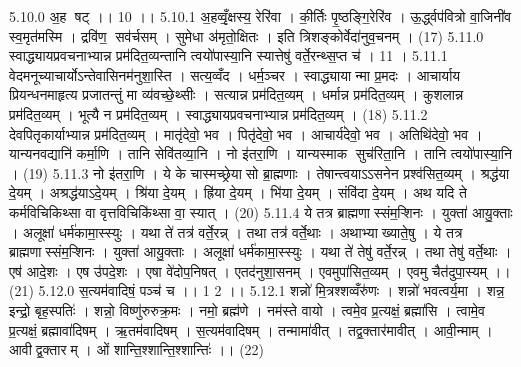 5.10.0
अ॒ह षट् ।। 10 ।।
5.10.1
अ॒हव्वृँ॒क्षस्य॒ रेरि॑वा । की॒र्तिः पृ॒ष्ठङ्गि॒रेरि॑व । ऊ॒र्द्ध्वप॑वित्रो वा॒जिनी॑व स्व॒मृत॑मस्मि । द्रवि॑ण॒॒ सव॑र्चसम् । सुमेधा अ॑मृतो॒क्षितः । इति त्रिशङ्कोर्वेदा॑नुव॒चनम् । (17)
5.11.0
स्वाद्ध्यायप्रवचनाभ्यान्न प्रम॑दित॒व्यन्तानि त्वयो॑पास्या॒नि स्यात्तेषु॑ वर्ते॒रन्थ्स॒प्त च॑ । 11 ।
5.11.1
वेदमनूच्याचार्योऽन्तेवासिनम॑नुशा॒स्ति । सत्य॒व्वँद । धर्म॒ञ्चर । स्वाद्ध्यायान्मा प्र॒मदः । आचार्याय प्रियन्धनमाहृत्य प्रजातन्तुं मा व्य॑वच्छे॒थ्सीः । सत्यान्न प्रम॑दित॒व्यम् । धर्मान्न प्रम॑दित॒व्यम् । कुशलान्न प्रम॑दित॒व्यम् । भूत्यै न प्रम॑दित॒व्यम् । स्वाद्ध्यायप्रवचनाभ्यान्न प्रम॑दित॒व्यम् । (18)
5.11.2
देवपितृकार्याभ्यान्न प्रम॑दित॒व्यम् । मातृ॑देवो॒ भव । पितृ॑देवो॒ भव । आचार्य॑देवो॒ भव । अतिथि॑देवो॒ भव । यान्यनवद्यानि॑ कर्मा॒णि । तानि सेवि॑तव्या॒नि । नो इ॑तरा॒णि । यान्यस्माक सुच॑रिता॒नि । तानि त्वयो॑पास्या॒नि । (19)
5.11.3
नो इ॑तरा॒णि । ये के चास्मच्छ्रेया॑सो ब्रा॒ह्मणाः । तेषान्त्वयाऽऽसनेन प्रश्व॑सित॒व्यम् । श्रद्ध॑या दे॒यम् । अश्रद्ध॑याऽदे॒यम् । श्रि॑या दे॒यम् । ह्रि॑या दे॒यम् । भि॑या दे॒यम् । संवि॑दा दे॒यम् । अथ यदि ते कर्मविचिकिथ्सा वा वृत्तविचिकि॑थ्सा वा॒ स्यात् । (20)
5.11.4
ये तत्र ब्राह्मणास्संम॒ऱ्शिनः । युक्ता॑ आयु॒क्ताः । अलूक्षा॑ धर्म॑कामा॒स्स्युः । यथा ते॑ तत्र॑ वर्ते॒रन्न् । तथा तत्र॑ वर्ते॒थाः । अथाभ्याख्याते॒षु । ये तत्र ब्राह्मणास्संम॒ऱ्शिनः । युक्ता॑ आयु॒क्ताः । अलूक्षा॑ धर्म॑कामा॒स्स्युः । यथा ते॑ तेषु॑ वर्ते॒रन्न् । तथा तेषु॑ वर्ते॒थाः । एष॑ आदे॒शः । एष उ॑पदे॒शः । एषा वे॑दोप॒निषत् । एतद॑नुशा॒सनम् । एवमुपा॑सित॒व्यम् । एवमु चैत॑दुपा॒स्यम् ।। (21)
5.12.0
स॒त्यम॑वादिषं॒ पञ्च॑ च ।। 1 2 ।।
5.12.1
शन्नो॑ मि॒त्रश्शव्वँरु॑णः । शन्नो॑ भवत्वर्य॒मा । शन्न॒ इन्द्रो॒ बृह॒स्पतिः॑ । शन्नो॒ विष्णु॑रुरुक्र॒मः । नमो॒ ब्रह्म॑णे । नम॑स्ते वायो । त्वमे॒व प्र॒त्यक्षं॒ ब्रह्मा॑सि । त्वामे॒व प्र॒त्यक्षं॒ ब्रह्मावा॑दिषम् । ऋ॒तम॑वादिषम् । स॒त्यम॑वादिषम् । तन्मामा॑वीत् । तद्व॒क्तार॑मावीत् । आवी॒न्माम् । आवीद्व॒क्तारम् । ओं शान्ति॒श्शान्ति॒श्शान्तिः॑ ।। (22)

